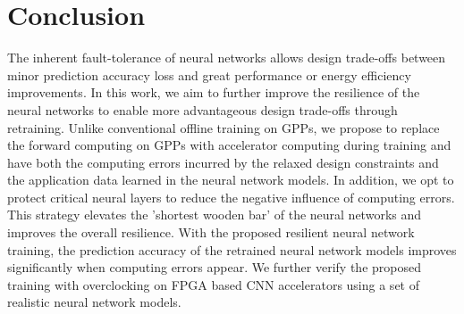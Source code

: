 \section{Conclusion} \label{sec:Conclusion}
The inherent fault-tolerance of neural networks allows design trade-offs between 
minor prediction accuracy loss and great performance or energy efficiency improvements. 
In this work, we aim to further improve the resilience of the neural networks to enable 
more advantageous design trade-offs through retraining. Unlike conventional offline training on GPPs, 
we propose to replace the forward computing on GPPs with accelerator computing during training and have both the computing 
errors incurred by the relaxed design constraints and the application data learned in the neural network models. 
In addition, we opt to protect critical neural layers to reduce the negative 
influence of computing errors. This strategy elevates the 'shortest wooden bar' of 
the neural networks and improves the overall resilience. With the proposed resilient neural network training, 
the prediction accuracy of the retrained neural network models improves significantly 
when computing errors appear. We further verify the proposed training 
with overclocking on FPGA based CNN accelerators using a set of realistic neural network models.



